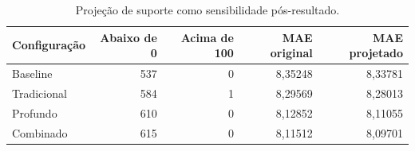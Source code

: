 \begin{table}[htbp]
\centering\small
\caption{Projeção de suporte como sensibilidade pós-resultado.}
\label{tab:clipping}
\begin{tabular}{lrrrr}
\toprule
Configuração & Abaixo de 0 & Acima de 100 & MAE original & MAE projetado \\
\midrule
Baseline & 537 & 0 & 8,35248 & 8,33781 \\
Tradicional & 584 & 1 & 8,29569 & 8,28013 \\
Profundo & 610 & 0 & 8,12852 & 8,11055 \\
Combinado & 615 & 0 & 8,11512 & 8,09701 \\
\bottomrule
\end{tabular}
\end{table}
